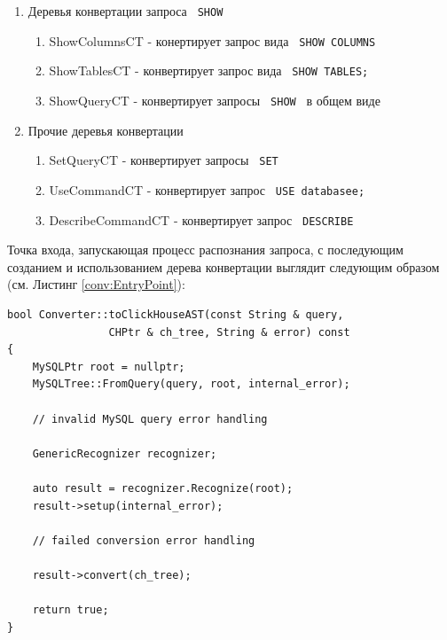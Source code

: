 \begin{enumerate}
\begin{enumerate}
    \end{enumerate}
    \item Деревья конвертации запроса \texttt{ SHOW } \begin{enumerate}
        \item ShowColumnsCT - конертирует запрос вида \texttt{ SHOW COLUMNS } 
        \item ShowTablesCT - конвертирует запрос вида \texttt{ SHOW TABLES; } 
        \item ShowQueryCT - конвертирует запросы \texttt{ SHOW } в общем виде 
    \end{enumerate}
    \item Прочие деревья конвертации \begin{enumerate}
        \item SetQueryCT - конвертирует запросы \texttt{ SET } 
        \item UseCommandCT - конвертирует запрос \texttt{ USE databasee; } 
        \item DescribeCommandCT - конвертирует запрос \texttt{ DESCRIBE }
    \end{enumerate}
\end{enumerate}

Точка входа, запускающая процесс распознания запроса, с последующим созданием и использованием дерева конвертации выглядит следующим образом (см. Листинг \ref{conv:EntryPoint}):

\begin{code}
    \label{conv:EntryPoint}
    \begin{verbatim}
bool Converter::toClickHouseAST(const String & query, 
                CHPtr & ch_tree, String & error) const
{
    MySQLPtr root = nullptr;
    MySQLTree::FromQuery(query, root, internal_error);

    // invalid MySQL query error handling

    GenericRecognizer recognizer;
    
    auto result = recognizer.Recognize(root);
    result->setup(internal_error);

    // failed conversion error handling

    result->convert(ch_tree);

    return true;
}
    \end{verbatim}
\end{code}

